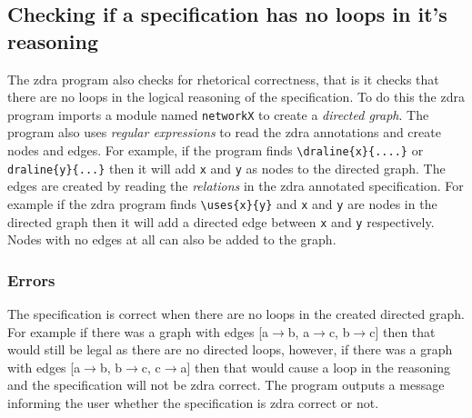 \subsection{Checking if a specification has no loops in it's reasoning}
\label{subsec:loops}

The \gls{zdra} program also checks for rhetorical correctness, that is it checks
that there are no loops in the logical reasoning of the specification. To do
this the \gls{zdra} program imports a module named \texttt{networkX} to create a
\emph{directed graph}. The program also uses \emph{regular expressions} to read
the \gls{zdra} annotations and create nodes and edges. For example, if the
program finds \verb|\draline{x}{....}| or \verb|draline{y}{...}| then it will
add \texttt{x} and \texttt{y} as nodes to the directed graph. The edges are
created by reading the \emph{relations} in the \gls{zdra} annotated
specification. For example if the \gls{zdra} program finds \verb|\uses{x}{y}|
and \texttt{x} and \texttt{y} are nodes in the directed graph then it will add a
directed edge between \texttt{x} and \texttt{y} respectively. Nodes with no
edges at all can also be added to the graph.

\subsubsection{Errors}
\label{subsubsec:zdra_looperrors}

The specification is correct when there are no loops in the created directed
graph. For example if there was a graph with edges [a$\rightarrow$b,
a$\rightarrow$c, b$\rightarrow$c] then that would still be legal as there are no
directed loops, however, if there was a graph with edges [a$\rightarrow$b,
b$\rightarrow$c, c$\rightarrow$a] then that would cause a loop in the reasoning
and the specification will not be \gls{zdra} correct. The program outputs a
message informing the user whether the specification is \gls{zdra} correct or
not.

